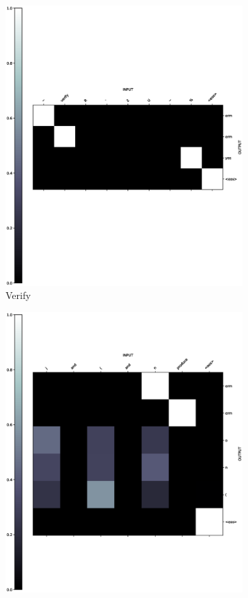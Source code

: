 \begin{figure}[H] 
	\begin{subfigure}[b]{0.5\linewidth}
		\centering
		\includegraphics[width=0.95\linewidth]{./figs/micro/learn-ver-eps}
		\caption{Verify} 
		\label{learn-ver} 
		\vspace{2ex}
	\end{subfigure}%
	\begin{subfigure}[b]{0.5\linewidth}
		\centering
		\includegraphics[width=0.95\linewidth]{./figs/micro/learn-prod-eps}

\end{subfigure}
\end{figure}
